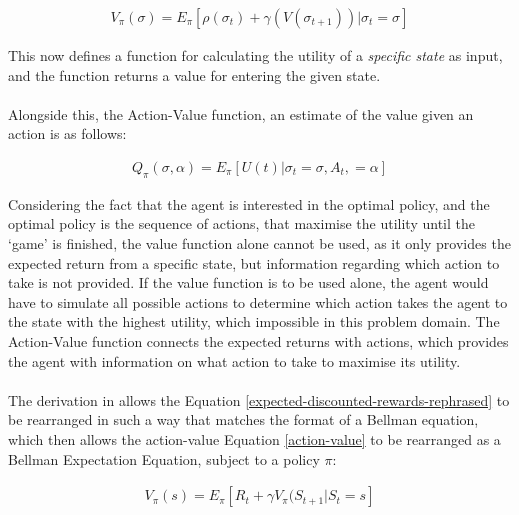 \documentclass[ %
                    author={Ashwinder Khurana},
                supervisor={Prof Dave Cliff},
                    degree={MEng},
                     title={The Deeply Reinforced Trader},
                  subtitle={},
                      type={enterprise},
                      year={2020} ]{dissertation}
\begin{document}
{\begin{equation}
\label{expected-discounted-rewards-rephrased}
\begin{split}
V_\pi (\sigma) = E_\pi [\rho(\sigma_t) + \gamma(V( \sigma_{t+1})) | \sigma_t = \sigma ]
\end{split}
\end{equation}

\noindent 
This now defines a function for calculating the utility of a \textit{specific state} as input, and the function returns a value for entering the given state.
\\
\\
Alongside this, the Action-Value function, an estimate of the value given an action is as follows:


\begin{equation}
\label{action-value}
\begin{split}
Q_\pi(\sigma , \alpha) = E_\pi [U(t) | \sigma_t = \sigma, A_t, = \alpha]
\end{split}
\end{equation}


\noindent 
Considering the fact that the agent is interested in the optimal policy, and the optimal policy is the sequence of actions, that maximise the utility until the \enquote*{game} is finished, the value function alone cannot be used, as it only provides the expected return from a specific state, but information regarding which action to take is not provided. If the value function is to be used alone, the agent would have to simulate all possible actions to determine which action takes the agent to the state with the highest utility, which impossible in this problem domain. The Action-Value function connects the expected returns with actions, which provides the agent with information on what action to take to maximise its utility. 
\\
\\
The derivation in \cite{rearrange-value-function https://www.jeremyjordan.me/markov-decision-process} allows the Equation \ref{expected-discounted-rewards-rephrased} to be rearranged in such a way that matches the format of a Bellman equation, which then allows the action-value Equation \ref{action-value} to be rearranged as a Bellman Expectation Equation, subject to a policy $\pi$:
{\color{red}{explain what a bellman equation is}}

\begin{equation}
\label{bellman}
\begin{split}
V_\pi(s) = E_\pi[R_t + \gamma V_\pi(S_{t+1} | S_t = s]
\end{split}
\end{equation}

}
\end{document}
